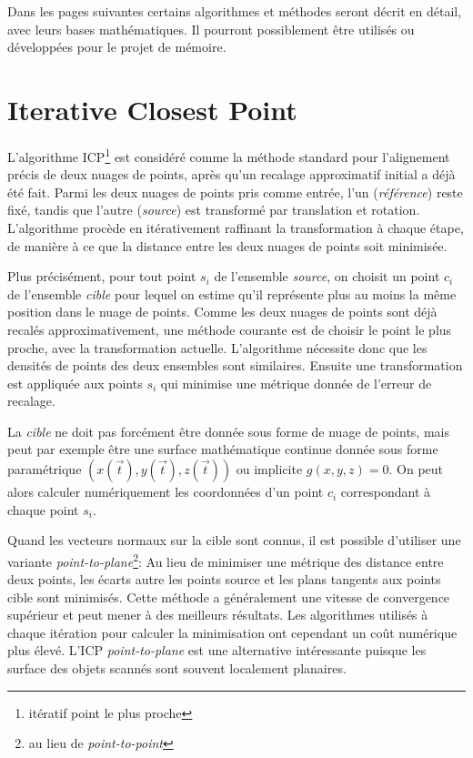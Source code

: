 \documentclass[a4paper,10pt]{scrreprt}
\begin{document}
Dans les pages suivantes certains algorithmes et méthodes seront décrit en détail, avec leurs bases mathématiques. Il pourront possiblement être utilisés ou développées pour le projet de mémoire.


\section{Iterative Closest Point}
L'algorithme ICP\footnote{itératif point le plus proche} est considéré comme la méthode standard pour l'alignement précis de deux nuages de points, après qu'un recalage approximatif initial a déjà été fait. Parmi les deux nuages de points pris comme entrée, l'un (\emph{référence}) reste fixé, tandis que l'autre (\emph{source}) est transformé par translation et rotation. L'algorithme procède en itérativement raffinant la transformation à chaque étape, de manière à ce que la distance entre les deux nuages de points soit minimisée.

Plus précisément, pour tout point $s_i$ de l'ensemble \emph{source}, on choisit un point $c_i$ de l'ensemble \emph{cible} pour lequel on estime qu'il représente plus au moins la même position dans le nuage de points. Comme les deux nuages de points sont déjà recalés approximativement, une méthode courante est de choisir le point le plus proche, avec la transformation actuelle. L'algorithme nécessite donc que les densités de points des deux ensembles sont similaires. Ensuite une transformation est appliquée aux points $s_i$ qui minimise une métrique donnée de l'erreur de recalage.

La \emph{cible} ne doit pas forcément être donnée sous forme de nuage de points, mais peut par exemple être une surface mathématique continue donnée sous forme paramétrique $(x(\vec{t}),y(\vec{t}),z(\vec{t}))$ ou implicite $g(x, y, z) = 0$. On peut alors calculer numériquement les coordonnées d'un point $c_i$ correspondant à chaque point $s_i$. \cite{Besl1992}

Quand les vecteurs normaux sur la cible sont connus, il est possible d'utiliser une variante \emph{point-to-plane}\footnote{au lieu de \emph{point-to-point}}: Au lieu de minimiser une métrique des distance entre deux points, les écarts autre les points source et les plans tangents aux points cible sont minimisés. Cette méthode a généralement une vitesse de convergence supérieur et peut mener à des meilleurs résultats. Les algorithmes utilisés à chaque itération pour calculer la minimisation ont cependant un coût numérique plus élevé. L'ICP \emph{point-to-plane} est une alternative intéressante puisque les surface des objets scannés sont souvent localement planaires. \cite{Low2004}
\end{document}

